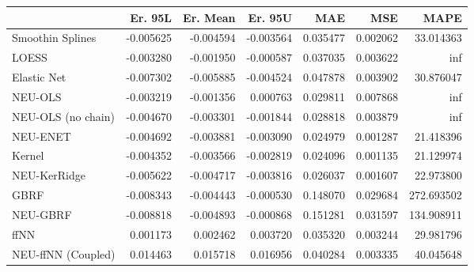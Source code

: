 \begin{tabular}{lrrrrrr}
\toprule
{} &   Er. 95L &  Er. Mean &   Er. 95U &       MAE &       MSE &        MAPE \\
\midrule
Smoothin Splines   & -0.005625 & -0.004594 & -0.003564 &  0.035477 &  0.002062 &   33.014363 \\
LOESS              & -0.003280 & -0.001950 & -0.000587 &  0.037035 &  0.003622 &         inf \\
Elastic Net        & -0.007302 & -0.005885 & -0.004524 &  0.047878 &  0.003902 &   30.876047 \\
NEU-OLS            & -0.003219 & -0.001356 &  0.000763 &  0.029811 &  0.007868 &         inf \\
NEU-OLS (no chain) & -0.004670 & -0.003301 & -0.001844 &  0.028818 &  0.003879 &         inf \\
NEU-ENET           & -0.004692 & -0.003881 & -0.003090 &  0.024979 &  0.001287 &   21.418396 \\
Kernel             & -0.004352 & -0.003566 & -0.002819 &  0.024096 &  0.001135 &   21.129974 \\
NEU-KerRidge       & -0.005622 & -0.004717 & -0.003816 &  0.026037 &  0.001607 &   22.973800 \\
GBRF               & -0.008343 & -0.004443 & -0.000530 &  0.148070 &  0.029684 &  272.693502 \\
NEU-GBRF           & -0.008818 & -0.004893 & -0.000868 &  0.151281 &  0.031597 &  134.908911 \\
ffNN               &  0.001173 &  0.002462 &  0.003720 &  0.035320 &  0.003244 &   29.981796 \\
NEU-ffNN (Coupled) &  0.014463 &  0.015718 &  0.016956 &  0.040284 &  0.003335 &   40.045648 \\
\bottomrule
\end{tabular}
